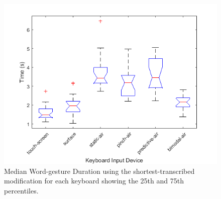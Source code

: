 \begin{figure}[t]
	\centering
	\includegraphics{Figures/fig_time_short_boxplot}
	\caption[Word-gesture Duration Boxplot for Modified-shortest]{Median Word-gesture Duration using the shortest-transcribed modification for each keyboard showing the 25th and 75th percentiles.}
	\label{fig_time_short_boxplot}
\end{figure}

